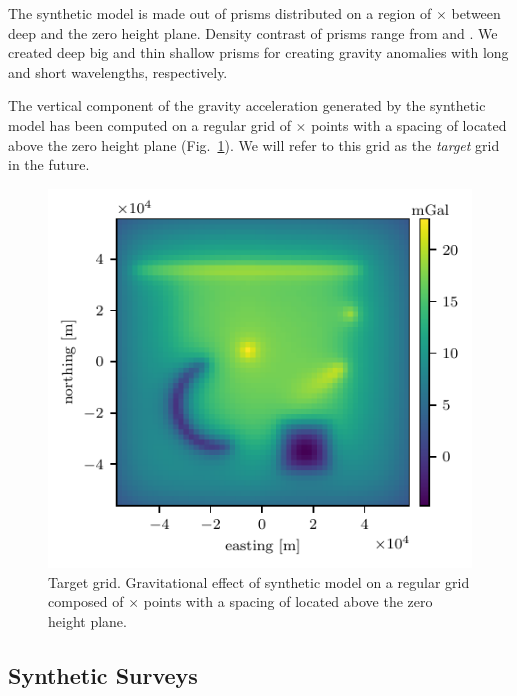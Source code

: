 \documentclass[twocolumn]{article}
\begin{document}
The synthetic model is made out of \NPrisms{} prisms distributed on a region of
\ModelEasting{}$\times$\ModelNorthing{} between \ModelDepth{} deep and the zero
height plane.
Density contrast of prisms range from \ModelMinDensity{} and
\ModelMaxDensity{}.
We created deep big and thin shallow prisms for creating gravity anomalies with
long and short wavelengths, respectively.

The vertical component of the gravity acceleration generated by the synthetic
model has been computed on a regular grid of
\TargetEastingSize{}$\times$\TargetNorthingSize{} points with a spacing of
\TargetSpacing{} located \TargetHeight{} above the zero height plane
(Fig.~\ref{fig:target-grid}).
We will refer to this grid as the \emph{target} grid in the future.

\begin{figure}
    \includegraphics[width=\linewidth]{figs/target-grid.pdf}
    \caption{
        Target grid. Gravitational effect of synthetic model on a regular grid
        composed of \TargetEastingSize{}$\times$\TargetNorthingSize{} points
        with a spacing of \TargetSpacing{} located \TargetHeight{} above the
        zero height plane.
    }
    \label{fig:target-grid}
\end{figure}

\subsection{Synthetic Surveys}
\end{document}
